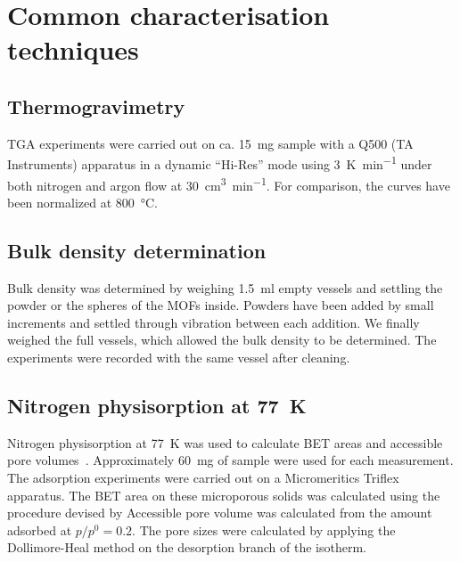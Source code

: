 
\graphicspath{ {\thisappx/figures/} }

\chapter{Common characterisation techniques}

\section{Thermogravimetry}\label{appx:char:TGA}

TGA experiments were carried out on ca. \SI{15}{\milli\gram} sample with a Q500 
(TA Instruments) apparatus in a dynamic “Hi-Res” mode using \SI{3}{\kelvin\per\minute}
under both nitrogen and argon flow at
\SI{30}{\cm\cubed\per\minute}. For comparison, the curves have been normalized at 
\SI{800}{\degreeCelsius}.

\section{Bulk density determination}

Bulk density was determined by weighing \SI{1.5}{\milli\litre} empty vessels and
settling the powder or the spheres of the MOFs inside. Powders have been added by small
increments and settled through vibration between each
addition. We finally weighed the full vessels, which allowed the bulk
density to be determined. The experiments were recorded with the
same vessel after cleaning.

\section{Nitrogen physisorption at \SI{77}{\kelvin}}

Nitrogen physisorption at \SI{77}{\kelvin} was used to calculate BET areas and accessible pore 
volumes~\cite{rouquerolAdsorptionPowdersPorous2013}. 
Approximately \SI{60}{\milli\gram} of sample were used for each measurement. 
The adsorption experiments were carried out on a Micromeritics Triflex apparatus.
The BET area on these microporous solids was calculated using the 
procedure devised by \citeauthor{rouquerolAdsorptionPowdersPorous2013} Accessible pore
volume was calculated from the amount adsorbed at \(p/p^0 = 0.2\). 
The pore sizes were calculated by applying the Dollimore-Heal method on the desorption
branch of the isotherm.

